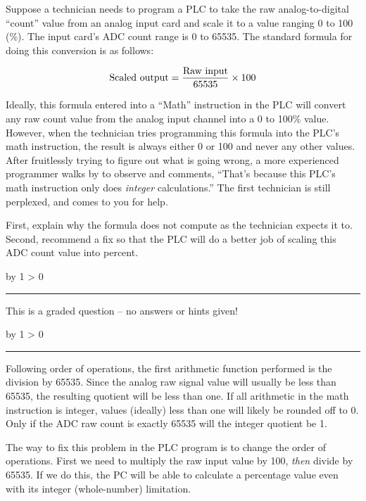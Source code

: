 \documentclass[12pt,a4paper]{article}
\def\svar{
           \advance\answnum by 1
           \ifnum \answnum > 0
                \hrule
                \vskip 3pt
                \leftline{Svar \the\answnum}
                \vskip 3pt \fi}
\def\notes{
           \advance\explnum by 1
           \ifnum \explnum > 0
                \hrule
                \vskip 3pt
                \leftline{Notes \the\explnum}
                \vskip 3pt \fi}
\begin{document}
Suppose a technician needs to program a PLC to take the raw analog-to-digital ``count'' value from an analog input card and scale it to a value ranging 0 to 100 (\%).  The input card's ADC count range is 0 to 65535.  The standard formula for doing this conversion is as follows:

$$\hbox{Scaled output} = {\hbox{Raw input} \over 65535} \times 100$$

Ideally, this formula entered into a ``Math'' instruction in the PLC will convert any raw count value from the analog input channel into a 0 to 100\% value.  However, when the technician tries programming this formula into the PLC's math instruction, the result is always either 0 or 100 and never any other values.  After fruitlessly trying to figure out what is going wrong, a more experienced programmer walks by to observe and comments, ``That's because this PLC's math instruction only does {\it integer} calculations.''  The first technician is still perplexed, and comes to you for help.  

\vskip 10pt

First, explain why the formula does not compute as the technician expects it to.  Second, recommend a fix so that the PLC will do a better job of scaling this ADC count value into percent.

\vfil

\eject
\vskip 10pt \filbreak 





\svar{} 

This is a graded question -- no answers or hints given!

\vskip 10pt \filbreak 





\notes{} 

Following order of operations, the first arithmetic function performed is the division by 65535.  Since the analog raw signal value will usually be less than 65535, the resulting quotient will be less than one.  If all arithmetic in the math instruction is integer, values (ideally) less than one will likely be rounded off to 0.  Only if the ADC raw count is exactly 65535 will the integer quotient be 1.

\vskip 10pt

The way to fix this problem in the PLC program is to change the order of operations.  First we need to multiply the raw input value by 100, {\it then} divide by 65535.  If we do this, the PC will be able to calculate a percentage value even with its integer (whole-number) limitation. 
\end{document}
